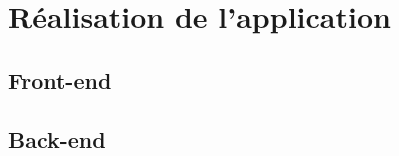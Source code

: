 \thispagestyle{plain}
\section{Réalisation de l'application}
\subsection{Front-end}
\subsection{Back-end}